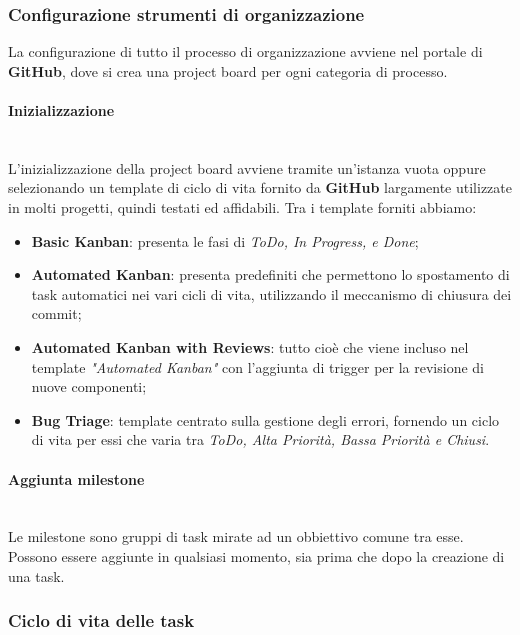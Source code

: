 \subsubsection{Configurazione strumenti di organizzazione}
	La configurazione di tutto il processo di organizzazione avviene nel portale di \textbf{GitHub}, dove si crea una project board per ogni categoria di processo. 	

\paragraph{Inizializzazione} \-\\
 L'inizializzazione della project board avviene tramite un'istanza vuota oppure selezionando un template di ciclo di vita fornito da \textbf{GitHub} largamente utilizzate in molti progetti, quindi testati ed affidabili. Tra i template forniti abbiamo: 

\begin{itemize}
		\item \textbf{Basic Kanban}: presenta le fasi di \textit{ToDo, In Progress, e Done}; 
		\item \textbf{Automated Kanban}: presenta  predefiniti che permettono lo spostamento di task
		 automatici nei vari cicli di vita, utilizzando il meccanismo di chiusura dei commit;
		\item \textbf{Automated Kanban with Reviews}: tutto cioè che viene incluso nel template \textit{"Automated Kanban"} con l'aggiunta di trigger per la revisione di nuove componenti; 
		\item \textbf{Bug Triage}: template centrato sulla gestione degli errori, fornendo un ciclo di vita per essi che varia tra \textit{ToDo, Alta Priorità, Bassa Priorità e Chiusi}. 
\end{itemize}
	  	
\paragraph{Aggiunta milestone} \-\\
	Le milestone sono gruppi di task mirate ad un obbiettivo comune tra esse.
	Possono essere aggiunte in qualsiasi momento, sia prima che dopo la creazione di una task.

\subsubsection{Ciclo di vita delle task}


